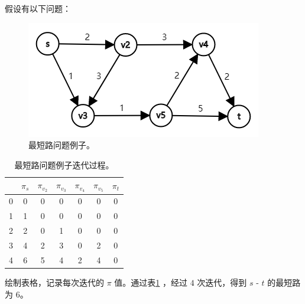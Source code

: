 假设有以下问题：
\begin{figure}[H]
    \begin{center}
        \includegraphics[scale=0.9]{img/drp_shortest_path.png}
        \caption{最短路问题例子。}
    \end{center}
\end{figure}
\begin{table}[!htbp]
    \centering
    \begin{tabular}{c|cccccc} 
        & $\pi_s$ & $\pi_{v_2}$ & $\pi_{v_3}$ & $\pi_{v_4}$ & $\pi_{v_5}$ & $\pi_t$ \\ 
        \hline 
        0 & 0 & 0 & 0 & 0 & 0 & 0 \\ 
        1 & 1 & 0 & 0 & 0 & 0 & 0 \\ 
        2 & 2 & 0 & 1 & 0 & 0 & 0 \\ 
        3 & 4 & 2 & 3 & 0 & 2 & 0 \\ 
        4 & 6 & 5 & 4 & 2 & 4 & 0
    \end{tabular}
    \caption{最短路问题例子迭代过程。}
    \label{table:drp_shortest_path}
\end{table}
绘制表格，记录每次迭代的 $\pi$ 值。通过表\ref{table:drp_shortest_path} ，经过 $4$ 次迭代，得到 $s$ - $t$ 的最短路为 $6$。

\pagebreak
